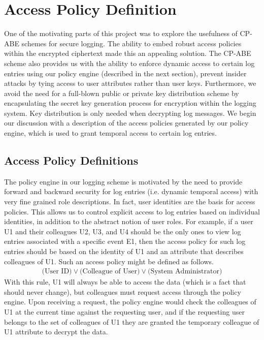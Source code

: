 \documentclass{sig-alternate}
\begin{document}
\section{Access Policy Definition}
One of the motivating parts of this project was to explore the usefulness of CP-ABE schemes
for secure logging. The ability to embed robust access policies within the encrypted
ciphertext made this an appealing solution. The CP-ABE scheme also provides us with the ability to
enforce dynamic access to certain log entries using our policy engine (described in the next section),
prevent insider attacks by tying access to user attributes rather than user keys. Furthermore,
we avoid the need for a full-blown public or private key distribution scheme by encapsulating the secret
key generation process for encryption within the logging system. Key distribution is only needed when
decrypting log messages. We begin our discussion with a description of the access policies generated
by our policy engine, which is used to grant temporal access to certain log entries.

\subsection{Access Policy Definitions}
The policy engine in our logging scheme is motivated by the need to provide forward and backward security
for log entries (i.e. dynamic temporal access) with very fine grained role descriptions. In 
fact, user identities are the basis for access policies. This allows us to control explicit access to log entries based on individual
identities, in addition to the abstract notion of user roles. For example, if a user 
U1 and their colleagues U2, U3, and U4 should be the only ones to view log entries associated with a specific event E1, then the access 
policy for such log entries should be based on the identity of U1 and an attribute that describes
colleagues of U1. Such an access policy might be defined as follows.
\begin{align*}
\text{(User ID)} \lor \text{(Colleague of User)} \lor \text{(System Administrator)}
\end{align*}
With this rule, U1 will always be able to access the data (which is a fact that should never change), but 
colleagues must request access through the policy engine. Upon receiving a request, the policy engine would
check the colleagues of U1 at the current time against the requesting user, and if the requesting user
belongs to the set of colleagues of U1 they are granted the temporary colleague of U1 attribute to decrypt the data. 
\end{document}
